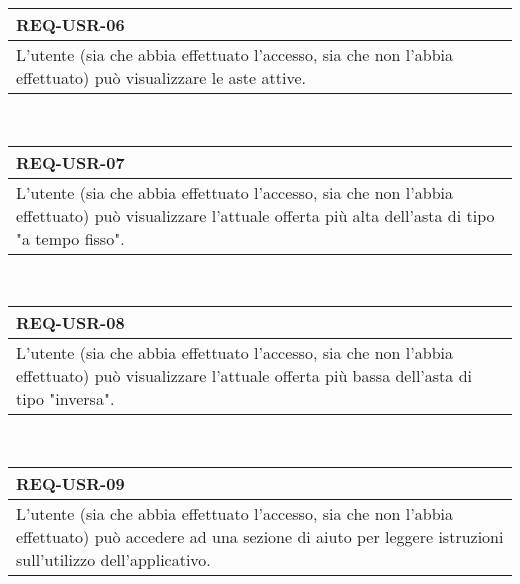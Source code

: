         \begin{tabular}{|p{}|}
            \hline
            \multicolumn{1}{|l|}{\cellcolor{head}\textbf{REQ-USR-06}} \\
            \hline
            L'utente (sia che abbia effettuato l'accesso, sia che non l'abbia effettuato) può visualizzare le aste attive. \\
            \hline
        \end{tabular} \smallskip \\
        \begin{tabular}{|p{}|}
            \hline
            \multicolumn{1}{|l|}{\cellcolor{head}\textbf{REQ-USR-07}} \\
            \hline
            L'utente (sia che abbia effettuato l'accesso, sia che non l'abbia effettuato) può visualizzare l'attuale offerta più alta dell'asta di tipo "a tempo fisso". \\
            \hline
        \end{tabular} \smallskip \\
        \begin{tabular}{|p{}|}
            \hline
            \multicolumn{1}{|l|}{\cellcolor{head}\textbf{REQ-USR-08}} \\
            \hline
            L'utente (sia che abbia effettuato l'accesso, sia che non l'abbia effettuato) può visualizzare l'attuale offerta più bassa dell'asta di tipo "inversa". \\
            \hline
        \end{tabular} \smallskip \\
        \begin{tabular}{|p{}|}
            \hline
            \multicolumn{1}{|l|}{\cellcolor{head}\textbf{REQ-USR-09}} \\
            \hline
            L'utente (sia che abbia effettuato l'accesso, sia che non l'abbia effettuato) può accedere ad una sezione di aiuto per leggere istruzioni sull'utilizzo dell'applicativo. \\
            \hline
        \end{tabular} \smallskip \\
